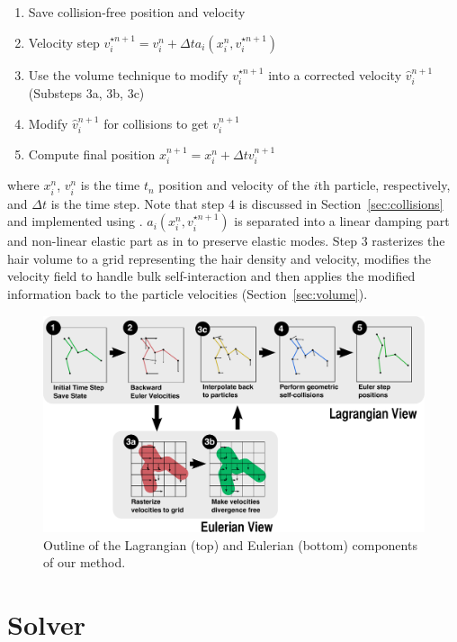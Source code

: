 {
\begin{enumerate}
\item Save collision-free position and velocity
\item Velocity step ${v}^{\star n+1}_i = {v}_i^n + \Delta t a_i(x^n_i,{v}^{\star  n+1}_i)$
\item Use the volume technique to modify $v^{\star n+1}_i$ into a corrected velocity
  $\hat{v}^{n+1}_i$  (Substeps 3a, 3b, 3c)
\item Modify $\hat{v}^{n+1}_i$ for collisions to get $v^{n+1}_i$ 
\item Compute final position $x^{n+1}_i = x^n_i + \Delta t v^{n+1}_i$
\end{enumerate}
}
where $x^n_i$, $v^n_i$ is the time $t_n$ position and velocity of the $i$th
particle, respectively, and $\Delta t$ is the time step. Note that step 4
is discussed in Section~\ref{sec:collisions} and implemented using
\cite{bridson:2002:cloth}.  $a_i(x^n_i,v^{\star n+1}_i)$ is separated into a linear
damping part and non-linear elastic part as in \cite{bridson:2003:cloth} to
preserve elastic modes. Step 3 rasterizes the hair volume to a grid representing
the hair density and velocity, modifies the velocity field to handle bulk
self-interaction and then applies the modified information back to the particle
velocities (Section~\ref{sec:volume}).




\begin{figure}[t!]
  \centering
  \includegraphics[width=1\linewidth]{hair/figures/redraw_geometric}
  \caption{\label{fig:outline} Outline of the Lagrangian (top) and Eulerian
    (bottom) components of our method.} 
\end{figure}

\vspace{-2pt}
\section{Solver}

